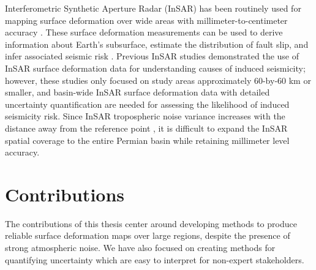 \documentclass{utexasthesis}
\begin{document}
 
% 
Interferometric Synthetic Aperture Radar (InSAR) has been routinely used for mapping surface deformation over wide areas with millimeter-to-centimeter accuracy \citep{Massonnet1993DisplacementFieldLanders, Buergmann2000SyntheticApertureRadar}.  These surface deformation measurements can be used to derive information about Earth's subsurface, estimate the distribution of fault slip, and infer associated seismic risk \citep{Segall2010EarthquakeVolcanoDeformation, Elliott2016RoleSpaceBased, Huang2017FaultGeometryInversion}. Previous InSAR studies demonstrated the use of InSAR surface deformation data for understanding causes of induced seismicity; however, these studies only focused on study areas approximately 60-by-60 km or smaller, and basin-wide InSAR surface deformation data with detailed uncertainty quantification are needed for assessing the likelihood of induced seismicity risk. Since InSAR tropospheric noise variance increases with the distance away from the reference point \citep{Emardson2003NeutralAtmosphericDelay}, it is difficult to expand the InSAR spatial coverage to the entire Permian basin while retaining millimeter level accuracy. 



\section{Contributions}
\label{sec:chap1-contributions}



The contributions of this thesis center around developing methods to produce reliable surface deformation maps over large regions, despite the presence of strong atmospheric noise. We have also focused on creating methods for quantifying uncertainty which are easy to interpret for non-expert stakeholders.
\end{document}
